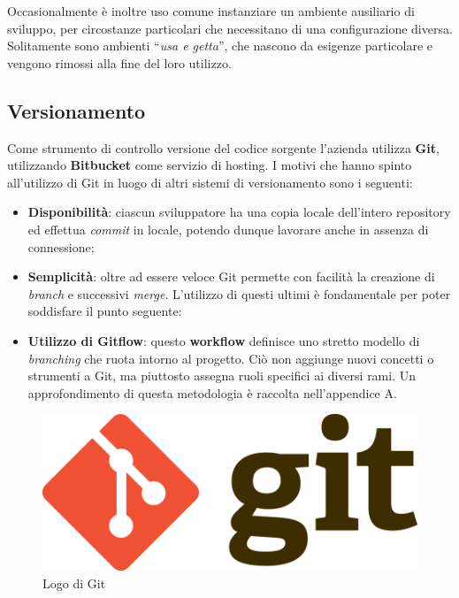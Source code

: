 Occasionalmente è inoltre uso comune instanziare un ambiente ausiliario di sviluppo, per circostanze particolari che necessitano di una configurazione diversa. Solitamente sono ambienti ``\textit{usa e getta}'', che nascono da esigenze particolare e vengono rimossi alla fine del loro utilizzo.

\subsection{Versionamento}

Come strumento di controllo versione del codice sorgente l'azienda utilizza \textbf{\gls{Git}}, utilizzando \textbf{Bitbucket} come servizio di hosting. I motivi che hanno spinto all'utilizzo di Git in luogo di altri sistemi di versionamento sono i seguenti:

\begin{itemize}

\item \textbf{Disponibilità}: ciascun sviluppatore ha una copia locale dell'intero repository ed effettua \textit{\gls{commit}} in locale, potendo dunque lavorare anche in assenza di connessione;

\item \textbf{Semplicità}: oltre ad essere veloce Git permette con facilità la creazione di \textit{branch} e successivi \textit{\gls{merge}}. L'utilizzo di questi ultimi è fondamentale per poter soddisfare il punto seguente:

\item \textbf{Utilizzo di Gitflow}: questo \textbf{workflow} definisce uno stretto modello di \textit{branching} che ruota intorno al progetto. Ciò non aggiunge nuovi concetti o strumenti a Git, ma piuttosto assegna ruoli specifici ai diversi rami. Un approfondimento di questa metodologia è raccolta nell'appendice A.

\end{itemize}

\begin{figure}[htpd]
\centering
\includegraphics[width=\textwidth/2]{../immagini/git-logo}
\caption{Logo di Git}
\end{figure}


